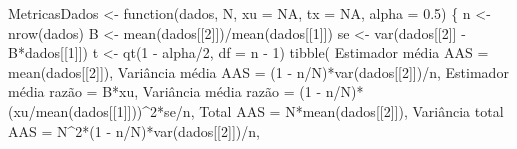 \documentclass[
  letterpaper,
  DIV=11,
  numbers=noendperiod]{scrartcl}
\newenvironment{Shaded}{\begin{snugshade}}{\end{snugshade}}
\newcommand{\AttributeTok}[1]{\textcolor[rgb]{0.40,0.45,0.13}{#1}}
\newcommand{\ConstantTok}[1]{\textcolor[rgb]{0.56,0.35,0.01}{#1}}
\newcommand{\ControlFlowTok}[1]{\textcolor[rgb]{0.00,0.23,0.31}{#1}}
\newcommand{\DecValTok}[1]{\textcolor[rgb]{0.68,0.00,0.00}{#1}}
\newcommand{\FloatTok}[1]{\textcolor[rgb]{0.68,0.00,0.00}{#1}}
\newcommand{\FunctionTok}[1]{\textcolor[rgb]{0.28,0.35,0.67}{#1}}
\newcommand{\NormalTok}[1]{\textcolor[rgb]{0.00,0.23,0.31}{#1}}
\newcommand{\OtherTok}[1]{\textcolor[rgb]{0.00,0.23,0.31}{#1}}
\newcommand{\SpecialCharTok}[1]{\textcolor[rgb]{0.37,0.37,0.37}{#1}}
\newcommand{\StringTok}[1]{\textcolor[rgb]{0.13,0.47,0.30}{#1}}
\begin{document}
\begin{Shaded}
\begin{Highlighting}[]
\NormalTok{MetricasDados }\OtherTok{\textless{}{-}} \ControlFlowTok{function}\NormalTok{(dados, N, }\AttributeTok{xu =} \ConstantTok{NA}\NormalTok{, }\AttributeTok{tx =} \ConstantTok{NA}\NormalTok{, }\AttributeTok{alpha =} \FloatTok{0.5}\NormalTok{) \{}
\NormalTok{  n }\OtherTok{\textless{}{-}} \FunctionTok{nrow}\NormalTok{(dados)}
\NormalTok{  B }\OtherTok{\textless{}{-}}  \FunctionTok{mean}\NormalTok{(dados[[}\DecValTok{2}\NormalTok{]])}\SpecialCharTok{/}\FunctionTok{mean}\NormalTok{(dados[[}\DecValTok{1}\NormalTok{]])}
\NormalTok{  se }\OtherTok{\textless{}{-}} \FunctionTok{var}\NormalTok{(dados[[}\DecValTok{2}\NormalTok{]] }\SpecialCharTok{{-}}\NormalTok{ B}\SpecialCharTok{*}\NormalTok{dados[[}\DecValTok{1}\NormalTok{]])}
\NormalTok{  t }\OtherTok{\textless{}{-}} \FunctionTok{qt}\NormalTok{(}\DecValTok{1} \SpecialCharTok{{-}}\NormalTok{ alpha}\SpecialCharTok{/}\DecValTok{2}\NormalTok{, }\AttributeTok{df =}\NormalTok{ n }\SpecialCharTok{{-}} \DecValTok{1}\NormalTok{)}
  \FunctionTok{tibble}\NormalTok{(}
    \StringTok{\textasciigrave{}}\AttributeTok{Estimador média AAS}\StringTok{\textasciigrave{}} \OtherTok{=} \FunctionTok{mean}\NormalTok{(dados[[}\DecValTok{2}\NormalTok{]]),}
    \StringTok{\textasciigrave{}}\AttributeTok{Variância média AAS}\StringTok{\textasciigrave{}} \OtherTok{=}\NormalTok{ (}\DecValTok{1} \SpecialCharTok{{-}}\NormalTok{ n}\SpecialCharTok{/}\NormalTok{N)}\SpecialCharTok{*}\FunctionTok{var}\NormalTok{(dados[[}\DecValTok{2}\NormalTok{]])}\SpecialCharTok{/}\NormalTok{n,}
    \StringTok{\textasciigrave{}}\AttributeTok{Estimador média razão}\StringTok{\textasciigrave{}} \OtherTok{=}\NormalTok{ B}\SpecialCharTok{*}\NormalTok{xu,}
    \StringTok{\textasciigrave{}}\AttributeTok{Variância média razão}\StringTok{\textasciigrave{}} \OtherTok{=}\NormalTok{ (}\DecValTok{1} \SpecialCharTok{{-}}\NormalTok{ n}\SpecialCharTok{/}\NormalTok{N)}\SpecialCharTok{*}\NormalTok{(xu}\SpecialCharTok{/}\FunctionTok{mean}\NormalTok{(dados[[}\DecValTok{1}\NormalTok{]]))}\SpecialCharTok{\^{}}\DecValTok{2}\SpecialCharTok{*}\NormalTok{se}\SpecialCharTok{/}\NormalTok{n,}
    \StringTok{\textasciigrave{}}\AttributeTok{Total AAS}\StringTok{\textasciigrave{}} \OtherTok{=}\NormalTok{ N}\SpecialCharTok{*}\FunctionTok{mean}\NormalTok{(dados[[}\DecValTok{2}\NormalTok{]]),}
    \StringTok{\textasciigrave{}}\AttributeTok{Variância total AAS}\StringTok{\textasciigrave{}} \OtherTok{=}\NormalTok{ N}\SpecialCharTok{\^{}}\DecValTok{2}\SpecialCharTok{*}\NormalTok{(}\DecValTok{1} \SpecialCharTok{{-}}\NormalTok{ n}\SpecialCharTok{/}\NormalTok{N)}\SpecialCharTok{*}\FunctionTok{var}\NormalTok{(dados[[}\DecValTok{2}\NormalTok{]])}\SpecialCharTok{/}\NormalTok{n,}

\end{Highlighting}
\end{Shaded}
\end{document}
